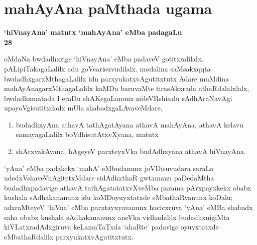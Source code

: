 \makeatletter
\def\@makechapterhead#1{%
  \vspace*{10\p@}%
\vspace*{25\p@}%
  {\parindent \z@ \centering \normalfont
    \ifnum \c@secnumdepth >\m@ne
      \if@mainmatter
        {\LARGE\bfseries  #1}\par\nobreak
	\vskip 4pt
      \fi
    \fi
\smallskip 

  }
\vskip 10\p@}
\makeatother

\chapter{mahAyAna paMthada ugama}

\setcounter{endnote}{0}

\begin{center}
{\textbf{\Large `hiVnayAna' matutx `mahAyAna' eMba padagaLu}}\\[15pt]
{\textbf{\Large 28}}
\end{center}

oMdaNa bwdadhxrige `hiVnayAna' eMba padaveV gotitxralilalx. pALipiTakagaLalilx adu goVcarisuvudilalx. modalina saMsakxqqta bwdadhxgarxMthagaLalilx idu parxyukatxvAgutitxtutx Adare muMdina mahAyAnagarxMthagaLalilx kaMDu baruvaMte tirasAkxrada athaRdalalxlalx, bwdadhxmatada I eraDu shAKegaLanunx nideVRshisalu sAdhAraNavAgi upayoVgisutitxdadx mUla shabadxgaLAvaveMdare,
\begin{enumerate}
\renewcommand{\theenumi}{\arabic{enumi}}
\renewcommand{\labelenumi}{(\theenumi)}
\item budadhxyAna athavA tathAgatAyana athavA mahAyAna, athavA kelavu samayagaLalilx boVdhisutAtxvXyana, matutx
\item shArxvakAyana, hAgeyeV parxteyxVka budAdhxyana athavA hiVnayAna.
\end{enumerate}

`yAna' eMba padakekx `mahA' eMbudanunx joVDisuvudara saraLa udedxVsha\-veVnAgitetxMdare sidAdhxthaR gwtamanu paDedaMtha budadhxpadavige athavA tathAgatatatxvXveMba parama pArxpayxkekx obabx kushala sAdhakananunx idu koMDoyuyxtatxde eMbathaRvanunx koDalu; adaraMteyeV `hiVna' eMba parxtayxyavanunx hacicxruva `yAna' eMBa shabadx saha obabx kushala sAdhakananunx aneVka vidhadalilx budadhxnigiMta  kiVLatxradAdxgiruva keLamaTaTxda `ahaRte' padavige oyuyxtatxde eMbathaRdalilx parxyukatxvAgutitxtutx.

